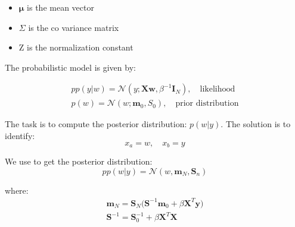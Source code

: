 \begin{itemize}
	\item $\bm{\mu }$ is the mean vector
	\item $\Sigma$ is the co variance matrix 
	\item Z is the normalization constant 
\end{itemize}

\begin{wbox}{}
The probabilistic model is given by:

\begin{equation}
\begin{aligned}
	pp(y|w) = \mathcal{N}(y;\bm{Xw}, \beta ^{-1}\bm{I}_N), \quad \text{likelihood} \\
	p(w)= \mathcal{N}(w; \bm{m}_0, S_0), \quad \text{prior distribution}
\end{aligned}
\end{equation}
\end{wbox}

The task is to compute the posterior distribution: $p(w|y)$. The solution is to identify:
\begin{equation}
	x_a = w, \quad x_b = y
\end{equation}

We use  to get the posterior distribution:
\begin{equation}
	pp(w|y)= \mathcal{N}(w,\bm{m}_N, \bm{S}_n)
\end{equation}


where:
\begin{equation}
\begin{aligned}
	\bm{m}_N = \bm{S}_N (\bm{S}^{-1}\bm{m}_0 + \beta \bm{X}^{T}\bm{y)} \\
	\bm{S}^{-1} = \bm{S}_0^{-1} + \beta \bm{X}^{T}\bm{X}
\end{aligned}
\end{equation}


